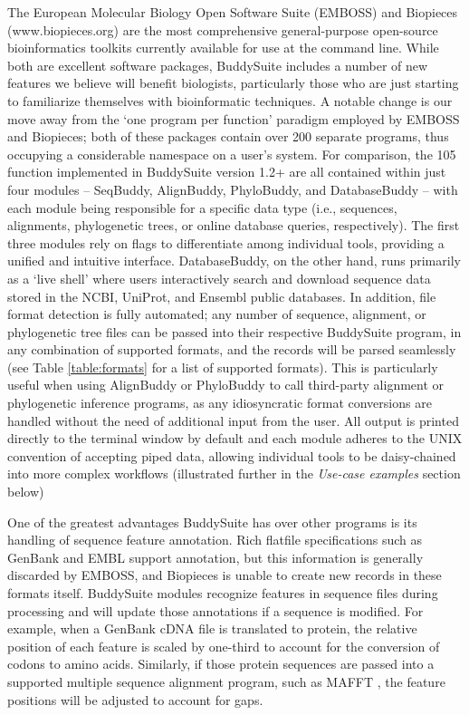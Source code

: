 \documentclass[nogrid]{MBE_article}%
\begin{document}
The European Molecular Biology Open Software Suite (EMBOSS) \cite{Rice:2000wr} and Biopieces (www.biopieces.org) are the most comprehensive general-purpose open-source bioinformatics toolkits currently available for use at the command line. While both are excellent software packages, BuddySuite includes a number of new features we believe will benefit biologists, particularly those who are just starting to familiarize themselves with bioinformatic techniques. A notable change is our move away from the `one program per function' paradigm employed by EMBOSS and Biopieces; both of these packages contain over 200 separate programs, thus occupying a considerable namespace on a user's system. For comparison, the 105 function implemented in BuddySuite version 1.2+ are all contained within just four modules -- SeqBuddy, AlignBuddy, PhyloBuddy, and DatabaseBuddy -- with each module being responsible for a specific data type (i.e., sequences, alignments, phylogenetic trees, or online database queries, respectively). The first three modules rely on flags to differentiate among individual tools, providing a unified and intuitive interface. DatabaseBuddy, on the other hand, runs primarily as a `live shell' where users interactively search and download sequence data stored in the NCBI, UniProt, and Ensembl public databases. In addition, file format detection is fully automated; any number of sequence, alignment, or phylogenetic tree files can be passed into their respective BuddySuite program, in any combination of supported formats, and the records will be parsed seamlessly (see Table \ref{table:formats} for a list of supported formats). This is particularly useful when using AlignBuddy or PhyloBuddy to call third-party alignment or phylogenetic inference programs, as any idiosyncratic format conversions are handled without the need of additional input from the user. All output is printed directly to the terminal window by default and each module adheres to the UNIX convention of accepting piped data, allowing individual tools to be daisy-chained into more complex workflows (illustrated further in the \emph{Use-case examples} section below)

One of the greatest advantages BuddySuite has over other programs is its handling of sequence feature annotation. Rich flatfile specifications such as GenBank and EMBL support annotation, but this information is generally discarded by EMBOSS, and Biopieces is unable to create new records in these formats itself. BuddySuite modules recognize features in sequence files during processing and will update those annotations if a sequence is modified. For example, when a GenBank cDNA file is translated to protein, the relative position of each feature is scaled by one-third to account for the conversion of codons to amino acids. Similarly, if those protein sequences are passed into a supported multiple sequence alignment program, such as MAFFT \cite{Katoh:2013hm}, the feature positions will be adjusted to account for gaps.
\end{document}
